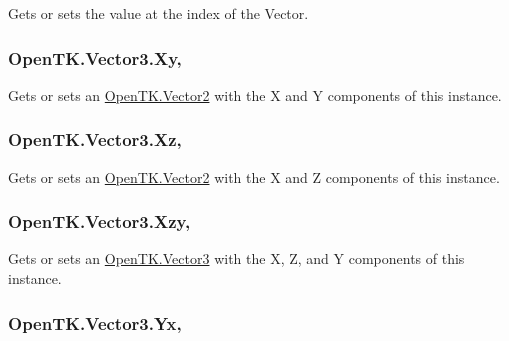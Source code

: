 Gets or sets the value at the index of the Vector. 

\hypertarget{struct_open_t_k_1_1_vector3_a9ba609953357c0a84043b8917b7e93f1}{
\subsubsection[{Xy}]{ Open\-T\-K.\-Vector3.\-Xy\hspace{0.3cm}{\ttfamily [get]}, {\ttfamily [set]}}}\label{struct_open_t_k_1_1_vector3_a9ba609953357c0a84043b8917b7e93f1}


Gets or sets an \hyperlink{struct_open_t_k_1_1_vector2}{Open\-T\-K.\-Vector2} with the X and Y components of this instance. 

\hypertarget{struct_open_t_k_1_1_vector3_afa545fdfe354309cbce5785ff1ad3193}{
\subsubsection[{Xz}]{ Open\-T\-K.\-Vector3.\-Xz\hspace{0.3cm}{\ttfamily [get]}, {\ttfamily [set]}}}\label{struct_open_t_k_1_1_vector3_afa545fdfe354309cbce5785ff1ad3193}


Gets or sets an \hyperlink{struct_open_t_k_1_1_vector2}{Open\-T\-K.\-Vector2} with the X and Z components of this instance. 

\hypertarget{struct_open_t_k_1_1_vector3_a50a9ce0de3089c7d6d35b5d45771b71e}{
\subsubsection[{Xzy}]{ Open\-T\-K.\-Vector3.\-Xzy\hspace{0.3cm}{\ttfamily [get]}, {\ttfamily [set]}}}\label{struct_open_t_k_1_1_vector3_a50a9ce0de3089c7d6d35b5d45771b71e}


Gets or sets an \hyperlink{struct_open_t_k_1_1_vector3}{Open\-T\-K.\-Vector3} with the X, Z, and Y components of this instance. 

\hypertarget{struct_open_t_k_1_1_vector3_a0df25fa1e9d3714bc65f43efd8cf574e}{
\subsubsection[{Yx}]{ Open\-T\-K.\-Vector3.\-Yx\hspace{0.3cm}{\ttfamily [get]}, {\ttfamily [set]}}}\label{struct_open_t_k_1_1_vector3_a0df25fa1e9d3714bc65f43efd8cf574e}


